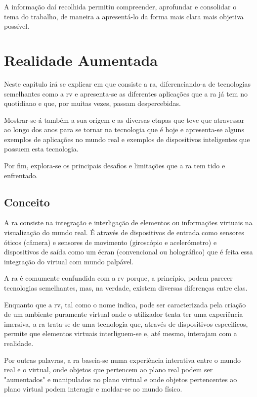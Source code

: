 \documentclass{report}
\begin{document}
A informação daí recolhida permitiu compreender, aprofundar e consolidar o tema do trabalho, de maneira a apresentá-lo da forma mais clara mais objetiva possível.

\chapter{Realidade Aumentada}
\label{chap.realidade-aumentada}
Neste capítulo irá se explicar em que consiste a \ac{ra}, diferenciando-a de tecnologias semelhantes como a \ac{rv} e apresenta-se as diferentes aplicações que a \ac{ra} já tem no quotidiano e que, por muitas vezes, passam despercebidas.

Mostrar-se-á também a sua origem e as diversas etapas que teve que atravessar ao longo dos anos para se tornar na tecnologia que é hoje e apresenta-se alguns exemplos de aplicações no mundo real e exemplos de dispositivos inteligentes que possuem esta tecnologia.

Por fim, explora-se os principais desafios e limitações que a \ac{ra} tem tido e enfrentado.

\section{Conceito}
A \ac{ra} consiste na integração e interligação de elementos ou informações virtuais na visualização do mundo real. É através de dispositivos de entrada como sensores óticos (câmera) e sensores de movimento (giroscópio e acelerómetro) e dispositivos de saída como um écran (convencional ou holográfico) que é feita essa integração do virtual com mundo palpável.

A \ac{ra} é comumente confundida com a \ac{rv} porque, a princípio, podem parecer tecnologias semelhantes, mas, na verdade, existem diversas diferenças entre elas.

Enquanto que a \ac{rv}, tal como o nome indica, pode ser caracterizada pela criação de um ambiente puramente virtual onde o utilizador tenta ter uma experiência imersiva, a \ac{ra} trata-se de uma tecnologia que, através de dispositivos especificos, permite que elementos virtuais interliguem-se e, até mesmo, interajam com a realidade.

Por outras palavras, a \ac{ra} baseia-se numa experiência interativa entre o mundo real e o virtual, onde objetos que pertencem ao plano real podem ser "aumentados" e manipulados no plano virtual e onde objetos pertencentes ao plano virtual podem interagir e moldar-se ao mundo físico.
\end{document}
